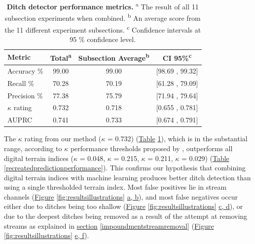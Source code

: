 \documentclass[11pt, review]{elsarticle} %
\begin{document}
\begin{table}[!htb]
\centering
    {\begin{tabular}{lccc}
        \textbf{Metric} & \textbf{Total}\textsuperscript{a} & \textbf{Subsection Average}\textsuperscript{b}& \textbf{CI 95\%}\textsuperscript{c} \\ 
        \hline
        Accuracy     \% & 99.00 & 99.00 & [98.69 , 99.32] \\
        Recall       \% & 70.28 & 70.19 & [61.28 , 79.09] \\
        Precision    \% & 77.38 & 75.79 & [71.94 , 79.64] \\
        $\kappa$ rating & 0.732 & 0.718 & [0.655 , 0.781] \\
        AUPRC           & 0.741 & 0.733 & [0.674 , 0.791] \\
        \hline
    \end{tabular}}
    \caption{\textbf{Ditch detector performance metrics.} \newline
    \textsuperscript{a} The result of all 11 subsection experiments when combined. \newline
    \textsuperscript{b} An average score from the 11 different experiment subsections. \newline
    \textsuperscript{c} Confidence intervals at 95 \% confidence level.}
    \label{predictionperformance}
\end{table}

The $\kappa$ rating from our method ($\kappa$ = 0.732) (\hyperref[predictionperformance]{Table} \ref{predictionperformance}), which is in the substantial range, according to $\kappa$ performance thresholds proposed by \citet{kappaanalysis}, outperforms all digital terrain indices ($\kappa$ = 0.048, $\kappa$ = 0.215, $\kappa$ = 0.211, $\kappa$ = 0.029) (\hyperref[recreatedpredictionperformance]{Table} \ref{recreatedpredictionperformance}). This confirms our hypothesis that combining digital terrain indices with machine learning produces better ditch detection than using a single thresholded terrain index. Most false positives lie in stream channels (\hyperref[fig:resultsillustrations]{Figure} \ref{fig:resultsillustrations} \hyperref[fig:resultsillustrations]{a, b}), and most false negatives occur either due to ditches being too shallow (\hyperref[fig:resultsillustrations]{Figure} \ref{fig:resultsillustrations} \hyperref[fig:resultsillustrations]{c, d}), or due to the deepest ditches being removed as a result of the attempt at removing streams as explained in \hyperref[impoundmentstreamremoval]{section} \ref{impoundmentstreamremoval} (\hyperref[fig:resultsillustrations]{Figure} \ref{fig:resultsillustrations} \hyperref[fig:resultsillustrations]{e, f}).
\end{document}
